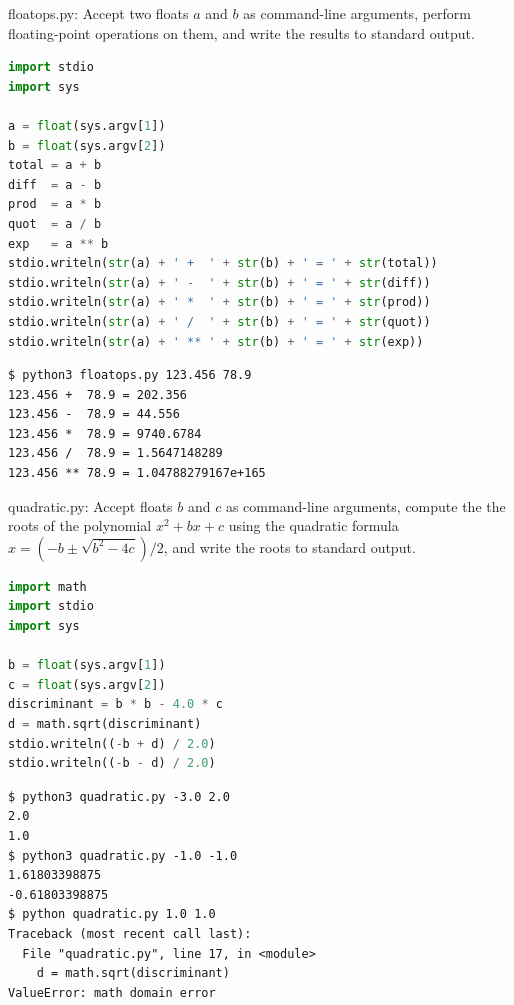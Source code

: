 \documentclass[8pt,a4paper,compress]{beamer}
\begin{document}
\begin{frame}[fragile]
\pause

\begin{framed}
\tiny floatops.py: Accept two floats $a$ and $b$ as command-line arguments, perform floating-point operations on them, and write the results to standard output.
\end{framed}

\begin{lstlisting}[language=Python]
import stdio
import sys

a = float(sys.argv[1])
b = float(sys.argv[2])
total = a + b
diff  = a - b
prod  = a * b
quot  = a / b
exp   = a ** b
stdio.writeln(str(a) + ' +  ' + str(b) + ' = ' + str(total))
stdio.writeln(str(a) + ' -  ' + str(b) + ' = ' + str(diff))
stdio.writeln(str(a) + ' *  ' + str(b) + ' = ' + str(prod))
stdio.writeln(str(a) + ' /  ' + str(b) + ' = ' + str(quot))
stdio.writeln(str(a) + ' ** ' + str(b) + ' = ' + str(exp))
\end{lstlisting}

\pause

\begin{lstlisting}[language={}]
$ python3 floatops.py 123.456 78.9
123.456 +  78.9 = 202.356
123.456 -  78.9 = 44.556
123.456 *  78.9 = 9740.6784
123.456 /  78.9 = 1.5647148289
123.456 ** 78.9 = 1.04788279167e+165
\end{lstlisting}
\end{frame}

\begin{frame}[fragile]
\pause

\begin{framed}
\tiny quadratic.py: Accept floats $b$ and $c$ as command-line arguments, compute the the roots of the polynomial $x^2 + bx + c$ using the quadratic formula $x=(-b\pm \sqrt{b^2-4c})/2$, and write the roots to standard output.
\end{framed}

\begin{lstlisting}[language=Python]
import math
import stdio
import sys

b = float(sys.argv[1])
c = float(sys.argv[2])
discriminant = b * b - 4.0 * c
d = math.sqrt(discriminant)
stdio.writeln((-b + d) / 2.0)
stdio.writeln((-b - d) / 2.0)
\end{lstlisting}

\pause

\begin{lstlisting}[language={}]
$ python3 quadratic.py -3.0 2.0
2.0
1.0
$ python3 quadratic.py -1.0 -1.0
1.61803398875
-0.61803398875
$ python quadratic.py 1.0 1.0
Traceback (most recent call last):
  File "quadratic.py", line 17, in <module>
    d = math.sqrt(discriminant)
ValueError: math domain error
\end{lstlisting}
\end{frame}
\end{document}
